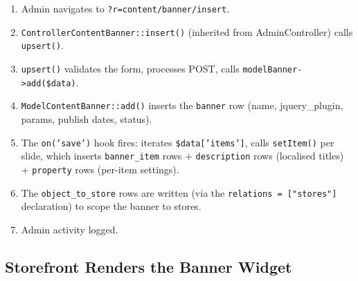 \documentclass[11pt,a4paper]{article}
\begin{document}
\begin{enumerate}[leftmargin=1.6em,itemsep=2pt]
  \item Admin navigates to \texttt{?r=content/banner/insert}.
  \item \texttt{ControllerContentBanner::insert()} (inherited from
        AdminController) calls \texttt{upsert()}.
  \item \texttt{upsert()} validates the form, processes POST, calls
        \texttt{modelBanner->add(\$data)}.
  \item \texttt{ModelContentBanner::add()} inserts the \texttt{banner}
        row (name, jquery\_plugin, params, publish dates, status).
  \item The \texttt{on('save')} hook fires: iterates
        \texttt{\$data['items']}, calls \texttt{setItem()} per slide,
        which inserts \texttt{banner\_item} rows + \texttt{description}
        rows (localised titles) + \texttt{property} rows (per-item
        settings).
  \item The \texttt{object\_to\_store} rows are written (via the
        \texttt{relations = ["stores"]} declaration) to scope the
        banner to stores.
  \item Admin activity logged.
\end{enumerate}

\subsection{Storefront Renders the Banner Widget}
\end{document}
